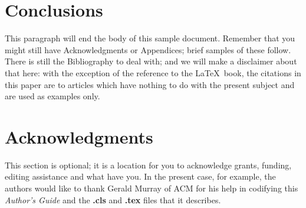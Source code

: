 \documentclass{sig-alternate-05-2015}
\begin{document}
\section{Conclusions}
This paragraph will end the body of this sample document.
Remember that you might still have Acknowledgments or
Appendices; brief samples of these
follow.  There is still the Bibliography to deal with; and
we will make a disclaimer about that here: with the exception
of the reference to the \LaTeX\ book, the citations in
this paper are to articles which have nothing to
do with the present subject and are used as
examples only.

\section{Acknowledgments}
This section is optional; it is a location for you
to acknowledge grants, funding, editing assistance and
what have you.  In the present case, for example, the
authors would like to thank Gerald Murray of ACM for
his help in codifying this \textit{Author's Guide}
and the \textbf{.cls} and \textbf{.tex} files that it describes.

%

  
\end{document}
